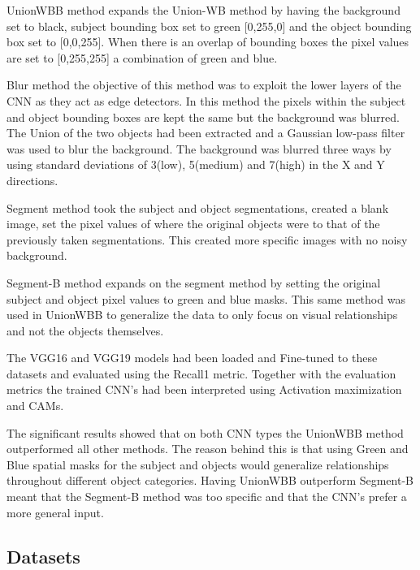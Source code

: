 \documentclass{csfyp}
\begin{document}
\Gls{UnionWBB} method expands the Union-WB method by having the background set to black, subject bounding box set to green [0,255,0] and the object bounding box set to [0,0,255]. When there is an overlap of bounding boxes the pixel values are set to [0,255,255] a combination of green and blue.

Blur method the objective of this method was to exploit the lower layers of the CNN as they act as edge detectors. In this method the pixels within the subject and object bounding boxes are kept the same but the background was blurred. The Union of the two objects had been extracted and a Gaussian low-pass filter was used to blur the background. The background was blurred three ways by using standard deviations of 3(low), 5(medium) and 7(high) in the X and Y directions. 

Segment method took the subject and object segmentations, created a blank image, set the pixel values of where the original objects were to that of the previously taken segmentations.
This created more specific images with no noisy background. 

Segment-B method expands on the segment method by setting the original subject and object pixel values to green and blue masks. This same method was used in \Gls{UnionWBB} to generalize the data to only focus on visual relationships and not the objects themselves. 

The VGG16 and VGG19 models had been loaded and Fine-tuned to these datasets and evaluated using the \Gls{Recall1} metric. Together with the evaluation metrics the trained CNN’s had been interpreted using Activation maximization and CAMs.

The significant results showed that on both CNN types the \Gls{UnionWBB} method outperformed all other methods. The reason behind this is that using Green and Blue spatial masks for the subject and objects would generalize relationships throughout different object categories. 
Having \Gls{UnionWBB} outperform Segment-B meant that the Segment-B method was too specific and that the CNN’s prefer a more general input.

\subsection{Datasets}
\end{document}

